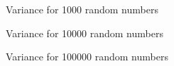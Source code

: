\documentclass[11pt]{article}
\begin{document}
\begin{figure}[H]
	\centering
	\caption{Variance for 1000 random numbers}
\end{figure}
\begin{figure}[H]
	\centering
	\caption{Variance for 10000 random numbers}
\end{figure}
\begin{figure}[H]
	\centering
	\caption{Variance for 100000 random numbers}
\end{figure}
\end{document}
